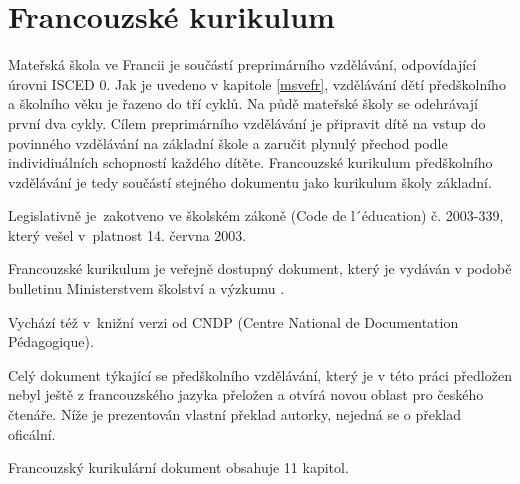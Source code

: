 	\section{Francouzské kurikulum}
	\label{frkurikulum}

		Mateřská škola ve Francii je součástí preprimárního vzdělávání, odpovídající úrovni ISCED 0. Jak je uvedeno v kapitole \ref{msvefr}, vzdělávání dětí předškolního a školního věku je řazeno do tří cyklů. Na půdě mateřské školy se odehrávají první dva cykly. Cílem preprimárního vzdělávání je připravit dítě na vstup do povinného vzdělávání na základní škole a  zaručit plynulý přechod podle individiuálních schopností každého dítěte. Francouzské kurikulum předškolního vzdělávání je tedy součástí stejného dokumentu jako kurikulum školy základní. 

		Legislativně je zakotveno ve školském zákoně (Code de l´éducation) č. 2003-339, který vešel v platnost 14. června 2003.
	
		Francouzské kurikulum je veřejně dostupný dokument, který je vydáván v podobě bulletinu Ministerstvem školství a výzkumu \citep{buletin}.

		Vychází též v knižní verzi od CNDP (Centre National de Documentation Pédagogique)\citep{CNDP}.

		Celý dokument týkající se předškolního vzdělávání, který je v této práci předložen nebyl ještě z francouzského jazyka přeložen a otvírá novou oblast pro českého čtenáře. Níže je prezentován vlastní překlad autorky, nejedná se o překlad oficální. 

		Francouzský kurikulární dokument obsahuje 11 kapitol. 

